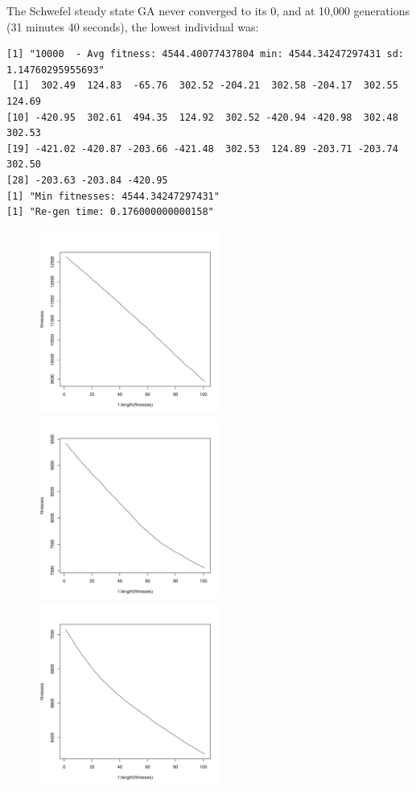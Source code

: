 \documentclass[12pt]{article}
\begin{document}
The Schwefel steady state GA never converged to its 0, and at 10,000 generations (31 minutes 40 seconds), the lowest individual was:
\scriptsize
\begin{lstlisting}
[1] "10000  - Avg fitness: 4544.40077437804 min: 4544.34247297431 sd: 1.14760295955693"
 [1]  302.49  124.83  -65.76  302.52 -204.21  302.58 -204.17  302.55  124.69
[10] -420.95  302.61  494.35  124.92  302.52 -420.94 -420.98  302.48  302.53
[19] -421.02 -420.87 -203.66 -421.48  302.53  124.89 -203.71 -203.74  302.50
[28] -203.63 -203.84 -420.95
[1] "Min fitnesses: 4544.34247297431"
[1] "Re-gen time: 0.176000000000158"

\end{lstlisting}
\normalsize

\pagebreak

\begin{figure}[!h]
        \begin{center}
		\includegraphics[width=60mm]{images/schwefel.ss/avg_101.pdf}
		\includegraphics[width=60mm]{images/schwefel.ss/avg_202.pdf}
		\includegraphics[width=60mm]{images/schwefel.ss/avg_303.pdf}

\end{center}
\end{figure}
\end{document}
